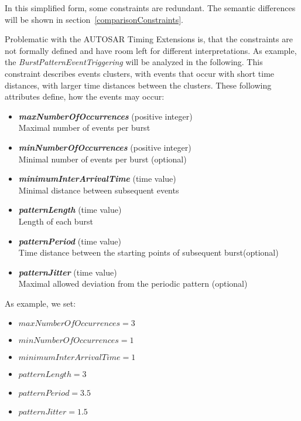 	In this simplified form, some constraints are redundant. The semantic differences will be shown in section~\ref{comparisonConstraints}.

	Problematic with the AUTOSAR Timing Extensions is, that the constraints are not formally defined and have room left for different interpretations. As example, the \emph{BurstPatternEventTriggering} will be analyzed in the following. This constraint describes events clusters, with events that occur with short time distances, with larger time distances between the clusters. These following attributes define, how the events may occur:
	\begin{itemize}
		\item
			\textbf{\emph{maxNumberOfOccurrences}} (positive integer)\\
			Maximal number of events per burst
		\item
			\textbf{\emph{minNumberOfOccurrences}} (positive integer)\\
			Minimal number of events per burst (optional)
		\item
			\textbf{\emph{minimumInterArrivalTime}} (time value)\\
			Minimal distance between subsequent events
		\item
			\textbf{\emph{patternLength}} (time value)\\
			Length of each burst
		\item
			\textbf{\emph{patternPeriod}} (time value)\\
			Time distance between the starting points of subsequent burst(optional)
		\item
			\textbf{\emph{patternJitter}} (time value)\\
			Maximal allowed deviation from the periodic pattern	(optional)
	\end{itemize}

As example, we set:
\begin{itemize}
	\item
	$maxNumberOfOccurrences = 3$
	\item
	$minNumberOfOccurrences = 1$
	\item
	$minimumInterArrivalTime = 1$
	\item
	$patternLength = 3$
	\item
	$patternPeriod = 3.5$
	\item
	$patternJitter = 1.5$
\end{itemize}

